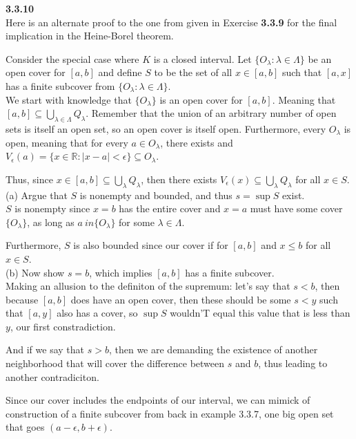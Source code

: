 \textbf{3.3.10}
\\

Here is an alternate proof to the one from given in Exercise \textbf{3.3.9}
for the final implication in the Heine-Borel theorem.

Consider the special case where $K$ is a closed interval.
Let $\{ O_\lambda : \lambda \in \Lambda \}$ be an open cover for $[a,b]$
and define $S$ to be the set of all $x \in [a,b]$ such that
$[a,x]$ has a finite subcover from $\{ O_\lambda : \lambda \in \Lambda \}$.
\\


We start with knowledge that $\{O_\lambda\}$ is an open cover for $[a,b]$.
Meaning that $[a,b] \subseteq \bigcup_{\lambda \in \Lambda} Q_\lambda$.
Remember that the union of an arbitrary number of open sets is itself an open set, so an open cover is itself open.
Furthermore, every $O_\lambda$ is open, meaning that for every $a \in O_\lambda$, there exists
and $V_\epsilon (a) = \{ x\in\mathbb{R} : |x-a| < \epsilon \} \subseteq O_\lambda$.

Thus, since $x \in [a,b] \subseteq \bigcup_{\lambda} Q_\lambda$, then there exists
$V_\epsilon (x) \subseteq \bigcup_{\lambda} Q_\lambda$ for all $x \in S$.
\\


(a) Argue that $S$ is nonempty and bounded, and thus $s = \sup S$ exist.
\\
$S$ is nonempty since $x=b$ has the entire cover and $x=a$ must have some cover $\{ O_\lambda \}$,
as long as $a \ in \{O_\lambda \}$ for some $\lambda \in \Lambda$.

Furthermore, $S$ is also bounded since our cover if for $[a,b]$ and $x \leq b$ for all $x \in S$.
\\


(b) Now show $s = b$, which implies $[a,b]$ has a finite subcover.
\\

Making an allusion to the definiton of the supremum: let's say that $s < b$, then because $[a,b]$ does
have an open cover, then these should be some $s < y$ such that $[a,y]$ also has a cover, so $\sup S$ wouldn'T
equal this value that is less than $y$, our first constradiction.

And if we say that $s > b$, then we are demanding the existence of another neighborhood that will cover
the difference between $s$ and $b$, thus leading to another contradiciton.

Since our cover includes the endpoints of our interval, we can mimick of construction of a finite subcover from
back in example 3.3.7, one big open set that goes $(a-\epsilon , b+\epsilon)$.
\\


